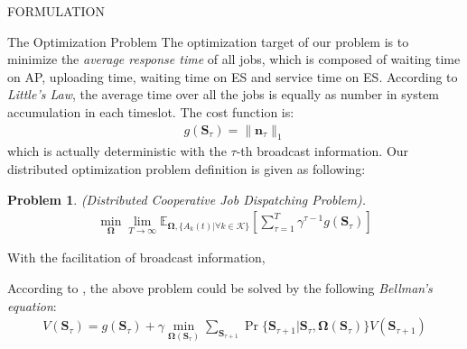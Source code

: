 \documentclass[10pt, conference, letterpaper]{IEEEtran}
\newtheorem{problem}{Problem}
\renewcommand{\vec}{\mathbf}
\newcommand{\apSet}{\mathcal{K}}
\newcommand{\Stat}{\mathbf{S}}
\newcommand{\Policy}{\mathbf{\Omega}}
\begin{document}
\begin{section}{FORMULATION}
        \begin{subsection}{The Optimization Problem}
            The optimization target of our problem is to minimize the \emph{average response time} of all jobs, which is composed of waiting time on AP, uploading time, waiting time on ES and service time on ES. According to \emph{Little's Law}, the average time over all the jobs is equally as number in system accumulation in each timeslot. The cost function is:
            \begin{align}
                g(\Stat_\tau) = \|\vec{n}_\tau\|_{1}
            \end{align}
            which is actually deterministic with the $\tau$-th broadcast information.
            Our distributed optimization problem definition is given as following:
            \begin{problem}
                (Distributed Cooperative Job Dispatching Problem).
                \begin{gather}
                    \min_{\Policy} \lim_{T \to \infty}
                        \mathbb{E}_{\Policy, \{A_k(t)|\forall k\in\apSet\}}
                            [\sum_{\tau=1}^{T} \gamma^{\tau-1} g(\Stat_\tau)]
                \end{gather}
            \end{problem}

            With the facilitation of broadcast information,


            According to \cite{sutton1998introduction}, the above problem could be solved by the following \emph{Bellman's equation}:
            \begin{align}
                V(\Stat_{\tau}) = g(\Stat_\tau) + \gamma \min_{\Policy(\Stat_\tau)} \sum_{\Stat_{\tau+1}} \Pr\{\Stat_{\tau+1}|\Stat_{\tau}, \Policy(\Stat_\tau)\} V(\Stat_{\tau+1})
            \end{align}
        \end{subsection}
    \end{section}
\end{document}
